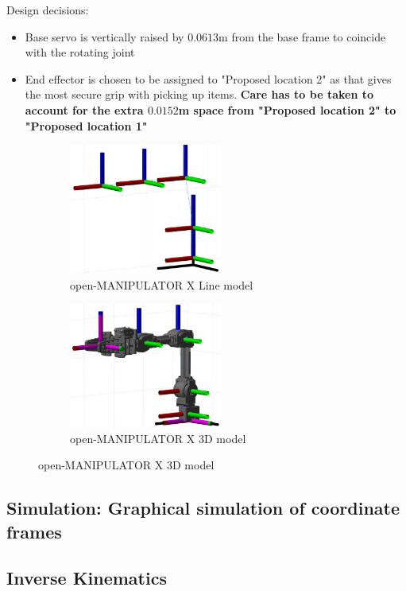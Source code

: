\documentclass[10pt, a4paper]{article}
\begin{document}
Design decisions:
\begin{itemize}
    \item Base servo is vertically raised by $0.0613$m from the base frame to
    coincide with the rotating joint 

    \item End effector is chosen to be assigned to "Proposed location 2" as that
    gives the most secure grip with picking up items. \textbf{Care has to be taken to
    account for the extra $0.0152$m space from "Proposed location 2" to
    "Proposed location 1"}
\end{itemize}


\begin{figure}[h!]
    \centering
    \begin{subfigure}{.5\textwidth}
      \centering
      \includegraphics[width=5cm]{Line model.JPG}
      \caption{open-MANIPULATOR X Line model}
    \end{subfigure}%
    \begin{subfigure}{.5\textwidth}
      \centering
      \includegraphics[width=5cm]{Robotic model.JPG}
      \caption{open-MANIPULATOR X 3D model}
    \end{subfigure}
\end{figure}

\vfill
\pagebreak

\subsection{Simulation: Graphical simulation of coordinate frames}

\subsection{Inverse Kinematics}
\end{document}
